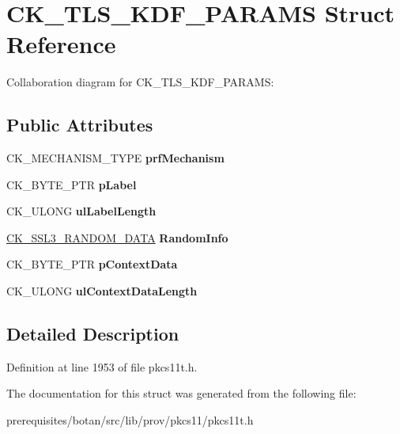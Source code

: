 \hypertarget{struct_c_k___t_l_s___k_d_f___p_a_r_a_m_s}{}\section{C\+K\+\_\+\+T\+L\+S\+\_\+\+K\+D\+F\+\_\+\+P\+A\+R\+A\+MS Struct Reference}
\label{struct_c_k___t_l_s___k_d_f___p_a_r_a_m_s}


Collaboration diagram for C\+K\+\_\+\+T\+L\+S\+\_\+\+K\+D\+F\+\_\+\+P\+A\+R\+A\+MS\+:
\subsection*{Public Attributes}
\begin{DoxyCompactItemize}
\item 
\mbox{\label{struct_c_k___t_l_s___k_d_f___p_a_r_a_m_s_a48bcde61505eab05d4f13f104d779f71}} 
C\+K\+\_\+\+M\+E\+C\+H\+A\+N\+I\+S\+M\+\_\+\+T\+Y\+PE {\bfseries prf\+Mechanism}
\item 
\mbox{\label{struct_c_k___t_l_s___k_d_f___p_a_r_a_m_s_ab28115d36034ff6b09924802842098b7}} 
C\+K\+\_\+\+B\+Y\+T\+E\+\_\+\+P\+TR {\bfseries p\+Label}
\item 
\mbox{\label{struct_c_k___t_l_s___k_d_f___p_a_r_a_m_s_a3811ef228dbb1d1a125767b521129fae}} 
C\+K\+\_\+\+U\+L\+O\+NG {\bfseries ul\+Label\+Length}
\item 
\mbox{\label{struct_c_k___t_l_s___k_d_f___p_a_r_a_m_s_afd08f5b71ccd5afd2f2e98c1c8b9a487}} 
\mbox{\hyperlink{struct_c_k___s_s_l3___r_a_n_d_o_m___d_a_t_a}{C\+K\+\_\+\+S\+S\+L3\+\_\+\+R\+A\+N\+D\+O\+M\+\_\+\+D\+A\+TA}} {\bfseries Random\+Info}
\item 
\mbox{\label{struct_c_k___t_l_s___k_d_f___p_a_r_a_m_s_af274160d565d75c39bdd5dd0c4e82e81}} 
C\+K\+\_\+\+B\+Y\+T\+E\+\_\+\+P\+TR {\bfseries p\+Context\+Data}
\item 
\mbox{\label{struct_c_k___t_l_s___k_d_f___p_a_r_a_m_s_a7bccf27647ecf2d8c41e7a63a69885f5}} 
C\+K\+\_\+\+U\+L\+O\+NG {\bfseries ul\+Context\+Data\+Length}
\end{DoxyCompactItemize}


\subsection{Detailed Description}


Definition at line 1953 of file pkcs11t.\+h.



The documentation for this struct was generated from the following file\+:\begin{DoxyCompactItemize}
\item 
prerequisites/botan/src/lib/prov/pkcs11/pkcs11t.\+h\end{DoxyCompactItemize}
